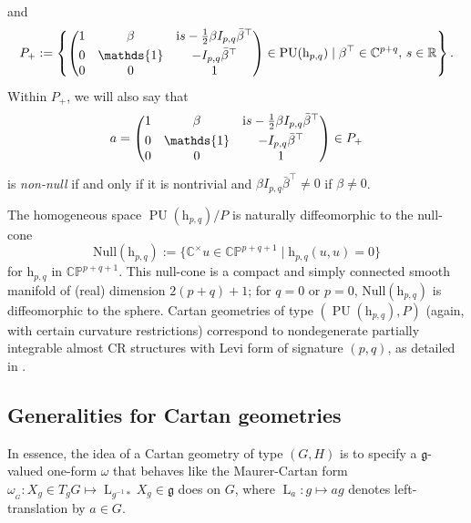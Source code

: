 \documentclass[pdftex]{sigma}
\numberwithin{equation}{section}
\theoremstyle{definition}
\DeclareMathOperator{\PU}{\mathrm{PU}}
\newcommand{\MC}[1]{\omega_{{}_{#1}}}
\newcommand{\Lt}[1]{\operatorname{L}_{#1}}
\begin{document}
and
\[P_+:=\left\{\begin{pmatrix}1 & \beta & \mathrm{i}s-\tfrac{1}{2}\beta I_{p,q} \bar{\beta}^\top \vspace{1mm}\\ 0 & \mathds{1} & -I_{p,q}\bar{\beta}^\top \\ 0 & 0 & 1\end{pmatrix}\in\PU(\mathrm{h}_{p,q})\mid \beta^\top\in\mathbb{C}^{p+q},\, s\in\mathbb{R}\right\}.\]
Within $P_+$, we will also say that \[a=\begin{pmatrix}1 & \beta & \mathrm{i}s-\tfrac{1}{2}\beta I_{p,q} \bar{\beta}^\top \vspace{1mm}\\ 0 & \mathds{1} & -I_{p,q}\bar{\beta}^\top \\ 0 & 0 & 1\end{pmatrix}\in P_+\] is \emph{non-null} if and only if it is nontrivial and $\beta I_{p,q}\bar{\beta}^\top\neq 0$ if $\beta\neq 0$.

The homogeneous space $\PU(\mathrm{h}_{p,q})/P$ is naturally diffeomorphic to the null-cone \[\mathrm{Null}(\mathrm{h}_{p,q}):=\bigl\{\mathbb{C}^\times u\in\mathbb{CP}^{p+q+1}\mid \mathrm{h}_{p,q}(u,u)=0\bigr\}\] for $\mathrm{h}_{p,q}$ in $\mathbb{CP}^{p+q+1}$. This null-cone is a compact and simply connected smooth manifold of (real) dimension $2(p+q)+1$; for $q=0$ or $p=0$, $\mathrm{Null}(\mathrm{h}_{p,q})$ is diffeomorphic to the sphere. Cartan geometries of type $(\PU(\mathrm{h}_{p,q}),P)$ (again, with certain curvature restrictions) correspond to nondegenerate partially integrable almost CR structures with Levi form of signature $(p,q)$, as detailed in \cite[Section~4.2.4]{CapSlovakPG1}.

\subsection{Generalities for Cartan geometries}
In essence, the idea of a Cartan geometry of type $(G,H)$ is to specify a $\mathfrak{g}$-valued one-form $\omega$ that behaves like the Maurer-Cartan form $\MC{G}\colon X_g\in T_g G\mapsto\Lt{g^{-1}*}X_g\in\mathfrak{g}$ does on $G$, where $\Lt{a}\colon g\mapsto ag$ denotes left-translation by $a\in G$.
\end{document}
